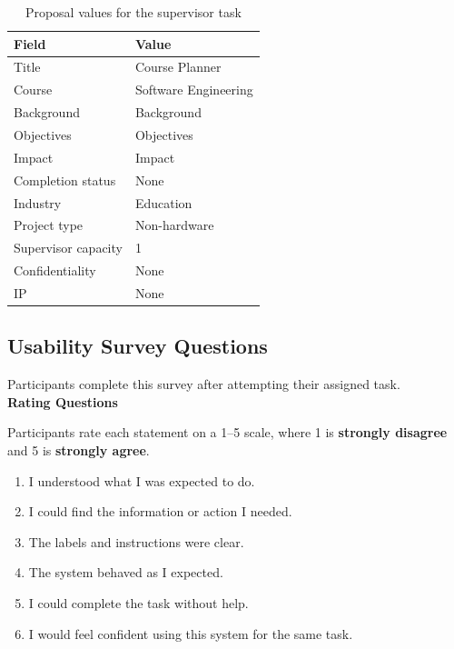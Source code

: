\documentclass[12pt, titlepage]{article}
\begin{document}
\begin{table}[h]
\centering
\caption{Proposal values for the supervisor task}
\label{tab:usability-proposal-values}
\begin{tabular}{l l}
  \toprule
  \textbf{Field} & \textbf{Value} \\
  \midrule
  Title & Course Planner \\
  Course & Software Engineering \\
  Background & Background \\
  Objectives & Objectives \\
  Impact & Impact \\
  Completion status & None \\
  Industry & Education \\
  Project type & Non-hardware \\
  Supervisor capacity & 1 \\
  Confidentiality & None \\
  IP & None \\
  \bottomrule
\end{tabular}
\end{table}

\subsection{Usability Survey Questions}
\label{app:usability-survey}

Participants complete this survey after attempting their assigned task. \\

\noindent\textbf{Rating Questions}

\noindent Participants rate each statement on a 1--5 scale, where 1 is
\textbf{strongly disagree} and 5 is \textbf{strongly agree}.

\begin{enumerate}
  \item I understood what I was expected to do.
  \item I could find the information or action I needed.
  \item The labels and instructions were clear.
  \item The system behaved as I expected.
  \item I could complete the task without help.
  \item I would feel confident using this system for the same task.
\end{enumerate}
\end{document}
